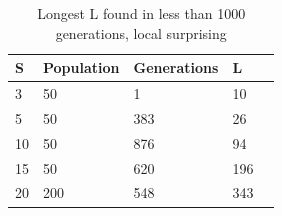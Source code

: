 \begin{table}[h!]
    \begin{tabular}{lllll}
        S  & Population & Generations & L%
        \\        \hline
        3  & 50              & 1           & 10
        \\
        5  & 50              & 383         & 26
        \\
        10 & 50              & 876         & 94
        \\
        15 & 50              & 620         & 196
        \\
        20 & 200             & 548        & 343
        \\
    \end{tabular}
    \caption{Longest L found in less than 1000 generations, local surprising}
\end{table}
